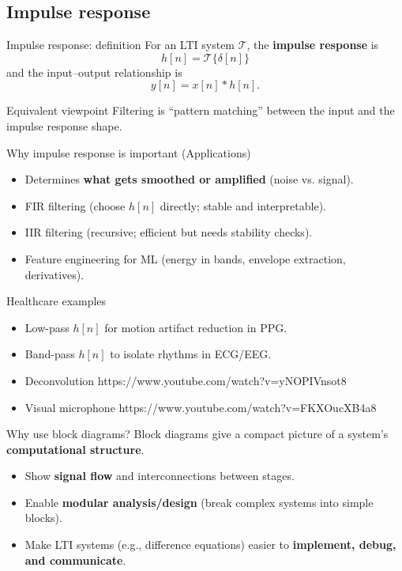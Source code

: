 \documentclass[aspectratio=169]{beamer}
\begin{document}
\subsection{Impulse response}

\begin{frame}{Impulse response: definition}
\small
For an LTI system $\mathcal{T}$, the \textbf{impulse response} is
\[
 h[n] = \mathcal{T}\{\delta[n]\}
\]
and the input--output relationship is
\[
 y[n] = x[n] * h[n].
\]
\begin{block}{Equivalent viewpoint}
Filtering is ``pattern matching'' between the input and the impulse response shape.
\end{block}
\end{frame}

\begin{frame}{Why impulse response is important (Applications)}
\small
\begin{itemize}
  \item Determines \textbf{what gets smoothed or amplified} (noise vs. signal).
  \item FIR filtering (choose $h[n]$ directly; stable and interpretable).
  \item IIR filtering (recursive; efficient but needs stability checks).
  \item Feature engineering for ML (energy in bands, envelope extraction, derivatives).
\end{itemize}
\begin{block}{Healthcare examples}
\begin{itemize}
  \item Low-pass $h[n]$ for motion artifact reduction in PPG.
  \item Band-pass $h[n]$ to isolate rhythms in ECG/EEG.
  \item Deconvolution https://www.youtube.com/watch?v=yNOPIVnsot8
  \item Visual microphone https://www.youtube.com/watch?v=FKXOucXB4a8
\end{itemize}
\end{block}
\end{frame}




\begin{frame}{Why use block diagrams?}
\small
Block diagrams give a compact picture of a system's \textbf{computational structure}.
\begin{itemize}
  \item Show \textbf{signal flow} and interconnections between stages.
  \item Enable \textbf{modular analysis/design} (break complex systems into simple blocks).
  \item Make LTI systems (e.g., difference equations) easier to \textbf{implement, debug, and communicate}.
\end{itemize}
\end{frame}
\end{document}
